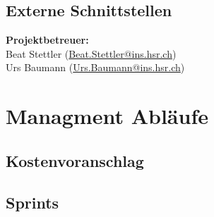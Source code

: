 \documentclass[11pt]{scrartcl}
\begin{document}

\subsection{Externe Schnittstellen}
\textbf{Projektbetreuer:} \\
Beat Stettler (\href{mailto:Beat.Stettler@ins.hsr.ch}{Beat.Stettler@ins.hsr.ch})  
\\
Urs Baumann (\href{mailto:Urs.Baumann@ins.hsr.ch}{Urs.Baumann@ins.hsr.ch})


\section{Managment Abläufe}

\subsection{Kostenvoranschlag}


\subsection{Sprints}
\end{document}
